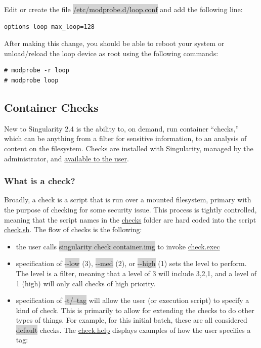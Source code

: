 \documentclass[a4paper]{article}
\begin{document}
Edit or create the file  \colorbox{lightgray}{/etc/modprobe.d/loop.conf} and add the following line:

\begin{lstlisting}[frame=single]
options loop max_loop=128
\end{lstlisting}

After making this change, you should be able to reboot your system or unload/reload the loop device as root using the following commands:

\begin{lstlisting}[frame=single]
# modprobe -r loop
# modprobe loop
\end{lstlisting}

\subsection{Container Checks}

New to Singularity 2.4 is the ability to, on demand, run container “checks,” which can be anything from a filter for sensitive information, to an analysis of content on the filesystem. Checks are installed with Singularity, managed by the administrator, and \href{http://singularity.lbl.gov/docs-user-checks}{available to the user}.

\subsubsection{What is a check?}
Broadly, a check is a script that is run over a mounted filesystem, primary with the purpose of checking for some security issue. This process is tightly controlled, meaning that the script names in the \href{https://github.com/singularityware/singularity/tree/development/libexec/helpers/checks}{checks} folder are hard coded into the script \href{https://github.com/singularityware/singularity/blob/development/libexec/helpers/check.sh}{check.sh}. The flow of checks is the following:
\\[0.1in]

\begin{itemize}
\item the user calls \colorbox{lightgray}{singularity check container.img} to invoke \href{https://github.com/singularityware/singularity/blob/development/libexec/cli/check.exec}{check.exec}
\item specification of  \colorbox{lightgray}{-{}-low} (3),  \colorbox{lightgray}{-{}-med} (2), or  \colorbox{lightgray}{-{}-high} (1) sets the level to perform. The level is a filter, meaning that a level of 3 will include 3,2,1, and a level of 1 (high) will only call checks of high priority.
\item specification of  \colorbox{lightgray}{-t/--tag} will allow the user (or execution script) to specify a kind of check. This is primarily to allow for extending the checks to do other types of things. For example, for this initial batch, these are all considered  \colorbox{lightgray}{default} checks. The \href{https://github.com/singularityware/singularity/blob/development/libexec/cli/check.help}{check.help} displays examples of how the user specifies a tag:
\end{itemize}
\end{document}
